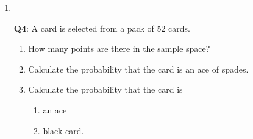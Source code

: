 \begin{enumerate}[label=\thechapter.\arabic*,ref=\thechapter.\theenumi]
\item 
\item[\textbf{Q4}:]
A card is selected from a pack of 52 cards.
\begin{enumerate}[label = (\alph*)]
\item How many points are there in the sample space?
\item Calculate the probability that the card is an ace of spades.
\item Calculate the probability that the card is 
           \begin{enumerate}[label = (\roman*)]
           \item an ace
           \item black card.
           \end{enumerate}
\end{enumerate}
\end{enumerate}
